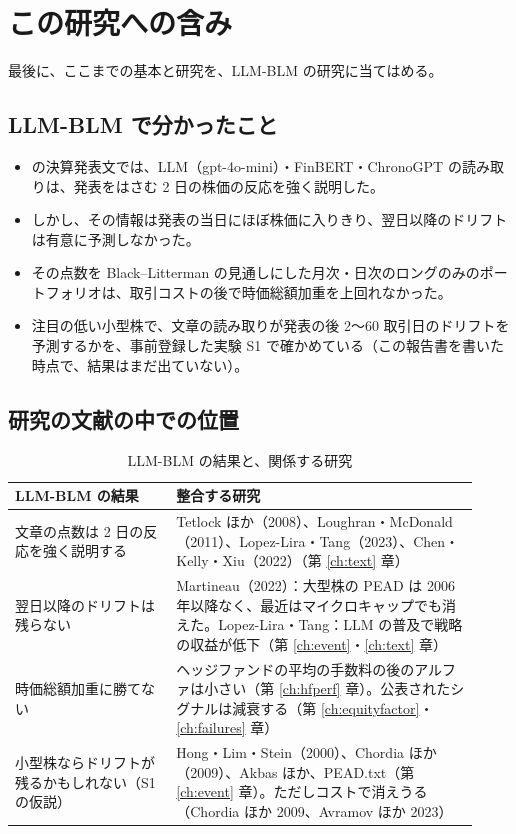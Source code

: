 \chapter{この研究への含み}
\label{ch:implications}

最後に、ここまでの基本と研究を、LLM-BLM の研究に当てはめる。

\section{LLM-BLM で分かったこと}

\begin{itemize}
\item \SP{} の決算発表文では、LLM（gpt-4o-mini）・FinBERT・ChronoGPT の読み取りは、発表をはさむ 2 日の株価の反応を強く説明した。
\item しかし、その情報は発表の当日にほぼ株価に入りきり、翌日以降のドリフトは有意に予測しなかった。
\item その点数を Black--Litterman の見通しにした月次・日次のロングのみのポートフォリオは、取引コストの後で時価総額加重を上回れなかった。
\item 注目の低い小型株で、文章の読み取りが発表の後 2〜60 取引日のドリフトを予測するかを、事前登録した実験 S1 で確かめている（この報告書を書いた時点で、結果はまだ出ていない）。
\end{itemize}

\section{研究の文献の中での位置}

\begin{table}[H]
\centering\small
\caption{LLM-BLM の結果と、関係する研究}
\label{tab:position}
\begin{tabular}{@{}P{0.32\linewidth}P{0.6\linewidth}@{}}
\toprule
LLM-BLM の結果 & 整合する研究 \\
\midrule
文章の点数は 2 日の反応を強く説明する & Tetlock ほか（2008）、Loughran・McDonald（2011）、Lopez-Lira・Tang（2023）、Chen・Kelly・Xiu（2022）（第 \ref{ch:text} 章） \\
翌日以降のドリフトは残らない & Martineau（2022）：大型株の PEAD は 2006 年以降なく、最近はマイクロキャップでも消えた。Lopez-Lira・Tang：LLM の普及で戦略の収益が低下（第 \ref{ch:event}・\ref{ch:text} 章） \\
時価総額加重に勝てない & ヘッジファンドの平均の手数料の後のアルファは小さい（第 \ref{ch:hfperf} 章）。公表されたシグナルは減衰する（第 \ref{ch:equityfactor}・\ref{ch:failures} 章） \\
小型株ならドリフトが残るかもしれない（S1 の仮説） & Hong・Lim・Stein（2000）、Chordia ほか（2009）、Akbas ほか、PEAD.txt（第 \ref{ch:event} 章）。ただしコストで消えうる（Chordia ほか 2009、Avramov ほか 2023） \\
\bottomrule
\end{tabular}
\end{table}

